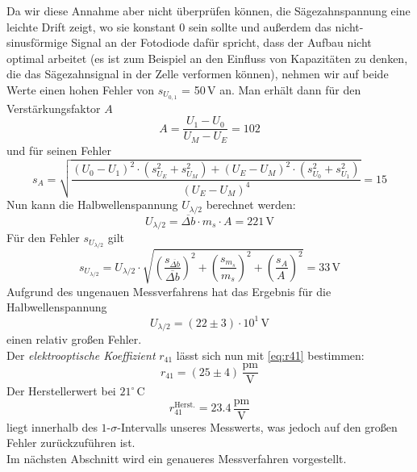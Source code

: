 Da wir diese Annahme aber nicht überprüfen können,
die Sägezahnspannung eine leichte Drift zeigt, wo sie konstant 0 sein sollte
und außerdem das nicht-sinusförmige
Signal an der Fotodiode dafür spricht, dass der Aufbau nicht optimal arbeitet
(es ist zum Beispiel an den Einfluss von Kapazitäten zu denken,
die das Sägezahnsignal in der Zelle verformen können),
nehmen wir auf beide Werte einen hohen Fehler von $s_{U_{0,1}}$ = 50\,V an.
Man erhält dann für den Verstärkungsfaktor $A$
\begin{equation}
  A=\frac{U_1-U_0}{U_M-U_E}=102
\end{equation}
und für seinen Fehler
\begin{equation}
  s_A=\sqrt{\frac{(U_0-U_1)^2 \cdot \left(s_{U_E}^2+s_{U_M}^2\right)+(U_E-U_M)^2 \cdot \left(s_{U_0}^2+s_{U_1}^2\right)}{(U_E-U_M)^4}}
  =15
\end{equation}
Nun kann die Halbwellenspannung $U_{\lambda / 2}$ berechnet werden:
\begin{equation}
  U_{\lambda / 2}  = \overline{\Delta b} \cdot m_s \cdot A = 221\,\text{V}
\end{equation}
Für den Fehler $s_{U_{\lambda / 2}}$ gilt
\begin{equation}
  s_{U_{\lambda / 2}} = U_{\lambda / 2} \cdot \sqrt{\left(\frac{s_{\overline{\Delta b}}}{\overline{\Delta b}}\right)^2+\left(\frac{s_{m_s}}{m_s}\right)^2+\left(\frac{s_{A}}{A_{\,}}\right)^2}
  = 33 \,\text{V}
\end{equation}
Aufgrund des ungenauen Messverfahrens hat das Ergebnis für die Halbwellenspannung
\begin{equation}
  U_{\lambda / 2}  = (22 \pm 3) \cdot 10^1\,\text{V}
\end{equation}
einen relativ großen Fehler. \\
Der \emph{elektrooptische Koeffizient} $r_41$ lässt sich nun mit \autoref{eq:r41} bestimmen:
\begin{equation}
  r_{41} = (25 \pm 4)\, \frac{\text{pm}}{\text{V}}
\end{equation}
Der Herstellerwert bei $21^\circ\,$C 
\begin{equation}
  r_{41}^{\text{Herst.}} = 23.4 \, \frac{\text{pm}}{\text{V}}
\end{equation} 
liegt innerhalb des $1$-$\sigma$-Intervalls unseres Messwerts, was jedoch auf den großen Fehler zurückzuführen ist.\\
Im nächsten Abschnitt wird ein genaueres Messverfahren vorgestellt.

